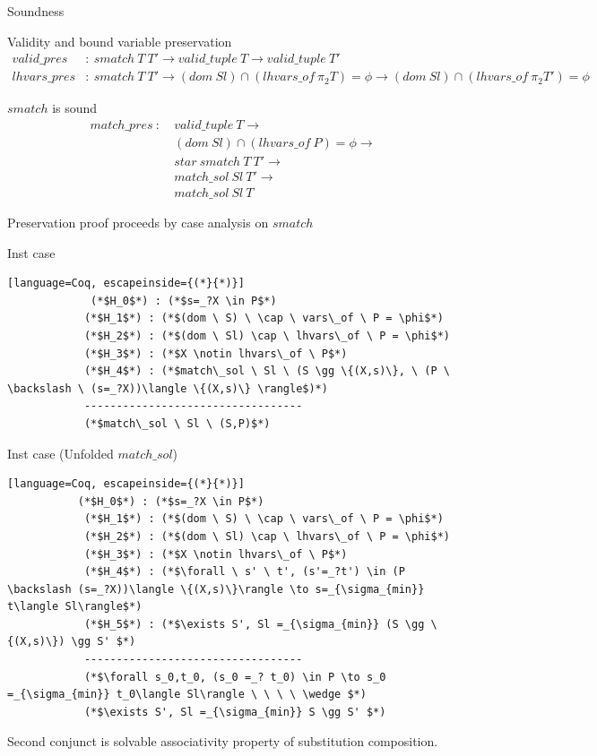 \documentclass[10pt]{beamer}
\begin{document}
\begin{frame}[t]{Soundness}
	\begin{block}{Validity and bound variable preservation}
		\begin{align*}
			valid\_pres &: \ smatch \ T \ T' \to valid\_tuple \ T \to valid\_tuple \ T' \\
			lhvars\_pres &: \ smatch \ T \ T' \to (dom \ Sl) \cap (lhvars\_of \ \pi_2 T) = \phi \to (dom \ Sl) \cap (lhvars\_of \ \pi_2 T') = \phi
		\end{align*}
	\end{block}
	\pause
	\begin{block}{$smatch$ is sound}
	\begin{align*}
		match\_pres  \ : \ &valid\_tuple \ T \to \\
		&(dom \ Sl) \cap (lhvars\_of \ P) = \phi \to \\
		& star \ smatch \ T \ T' \to  \\
		& match\_sol \ Sl \ T' \to \\
		& match\_sol \ Sl \ T 
	\end{align*}
	\end{block}
\end{frame}



\begin{frame}[fragile]{Preservation proof proceeds by case analysis on $smatch$}
	\begin{block}{Inst case }
		\begin{lstlisting}[language=Coq, escapeinside={(*}{*)}]
			 (*$H_0$*) : (*$s=_?X \in P$*)
		    (*$H_1$*) : (*$(dom \ S) \ \cap \ vars\_of \ P = \phi$*)
		    (*$H_2$*) : (*$(dom \ Sl) \cap \ lhvars\_of \ P = \phi$*)
		    (*$H_3$*) : (*$X \notin lhvars\_of \ P$*)
		    (*$H_4$*) : (*$match\_sol \ Sl \ (S \gg \{(X,s)\}, \ (P \ \backslash \ (s=_?X))\langle \{(X,s)\} \rangle$)*) 
			----------------------------------
			(*$match\_sol \ Sl \ (S,P)$*)
		\end{lstlisting}
	\end{block}
\end{frame}


\begin{frame}[fragile]{}
	\begin{block}{Inst case (Unfolded $match\_sol$) }
		\begin{lstlisting}[language=Coq, escapeinside={(*}{*)}]     
		   (*$H_0$*) : (*$s=_?X \in P$*)
			(*$H_1$*) : (*$(dom \ S) \ \cap \ vars\_of \ P = \phi$*)
			(*$H_2$*) : (*$(dom \ Sl) \cap \ lhvars\_of \ P = \phi$*)
			(*$H_3$*) : (*$X \notin lhvars\_of \ P$*)
			(*$H_4$*) : (*$\forall \ s' \ t', (s'=_?t') \in (P \backslash (s=_?X))\langle \{(X,s)\}\rangle \to s=_{\sigma_{min}} t\langle Sl\rangle$*)
			(*$H_5$*) : (*$\exists S', Sl =_{\sigma_{min}} (S \gg \{(X,s)\}) \gg S' $*)
			----------------------------------
			(*$\forall s_0,t_0, (s_0 =_? t_0) \in P \to s_0 =_{\sigma_{min}} t_0\langle Sl\rangle \ \ \ \ \wedge $*)
			(*$\exists S', Sl =_{\sigma_{min}} S \gg S' $*)
		\end{lstlisting}
	\end{block}
\pause
Second conjunct is solvable associativity property of substitution composition.
\end{frame}
\end{document}
